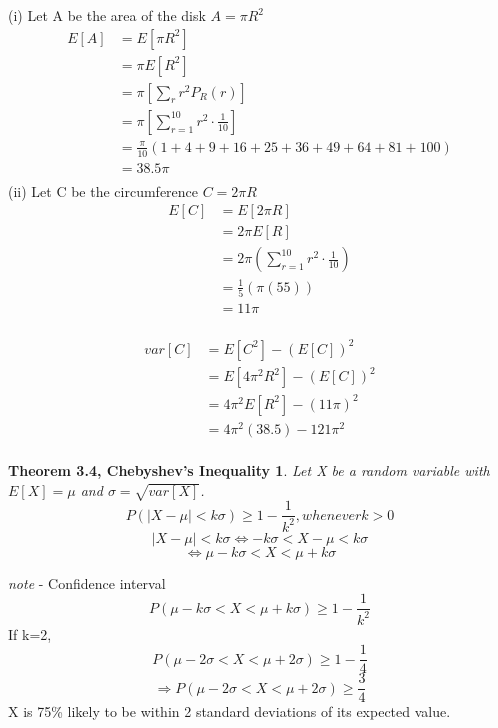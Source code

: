 \documentclass[10pt,letterpaper]{report}
\begin{document}
(i) Let A be the area of the disk $A={\pi}R^2$
\begin{align*}
E[A] & =E[{\pi}R^2]\\
& =\pi E[R^2]\\
& =\pi \left[\sum_r r^2 P_R(r)\right]\\
& =\pi \left[\sum_{r=1}^{10} r^2\cdot \frac{1}{10}\right]\\
& =\frac{\pi}{10}(1+4+9+16+25+36+49+64+81+100)\\
& =38.5\pi\\
\end{align*}
(ii) Let C be the circumference $C=2{\pi}R$
\begin{align*}
E[C] & =E[2{\pi}R]\\
& =2{\pi}E[R]\\
& =2{\pi}\left(\sum_{r=1}^{10}r^2\cdot\frac{1}{10}\right)\\
& =\frac{1}{5}(\pi(55))\\
& =11\pi\\
\end{align*}

\begin{align*}
var[C] & =E[C^2]-(E[C])^2\\
& =E[4{\pi}^2 R^2]-(E[C])^2\\
& =4\pi^2 E[R^2]-(11\pi)^2\\
& =4\pi^2(38.5)-121\pi^2\\
\end{align*}

\theoremstyle{nonum}
\newtheorem{threefour}{Theorem 3.4, Chebyshev's Inequality}
\begin{threefour}
Let X be a random variable with $E[X]=\mu$ and $\sigma=\sqrt{var[X]}$.
\[ P(|X-{\mu}| < k\sigma)\geq 1-\frac{1}{k^2}, whenever k > 0 \]
\[ |X-\mu| < k\sigma \Leftrightarrow -k\sigma < X - \mu < k\sigma \]
\[ \Leftrightarrow \mu - k\sigma < X < \mu + k\sigma \]
\end{threefour}
\emph{note} - Confidence interval
\[ P({\mu}-k \sigma < X < {\mu}+k\sigma) \geq 1-\frac{1}{k^2} \]
If k=2,
\[ P({\mu}-2\sigma < X < \mu+2\sigma) \geq 1-\frac{1}{4} \]
\[ \Rightarrow P(\mu - 2\sigma < X < \mu + 2\sigma) \geq \frac{3}{4} \]
X is 75\% likely to be within 2 standard deviations of its expected value.
\end{document}
